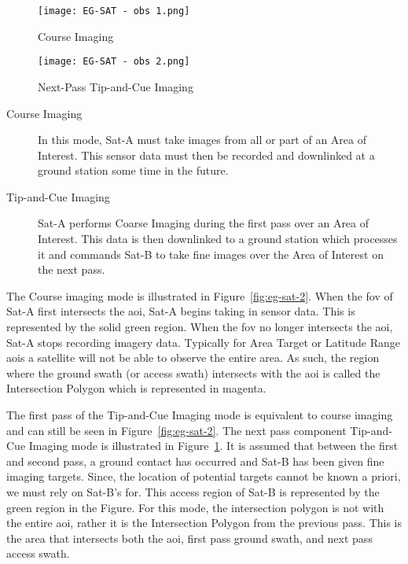 \begin{figure} 
    \centering
    \begin{minipage}[c]{0.49\textwidth}
	\centering
	\texttt{[image: EG-SAT - obs 1.png]} 
	\caption{Course Imaging}
	\label{fig:eg-sat-2} 
    \end{minipage}
    \hfill
    \begin{minipage}[c]{0.49\textwidth}
	\centering
	\texttt{[image: EG-SAT - obs 2.png]} 
	\caption{Next-Pass Tip-and-Cue Imaging}
	\label{fig:eg-sat-3} 
    \end{minipage} 
\end{figure}


\begin{description} 

    \item[Course Imaging] In this mode, Sat-A must take images from all or part
	of an Area of Interest. This sensor data must then be recorded and
	downlinked at a ground station some time in the future.

    \item[Tip-and-Cue Imaging] Sat-A performs Coarse Imaging during the first
	pass over an Area of Interest. This data is then downlinked to a ground
	station which processes it and commands Sat-B to take fine images over
	the Area of Interest on the next pass.

\end{description}

The Course imaging mode is illustrated in Figure~\ref{fig:eg-sat-2}. When the
\gls{fov} of Sat-A first intersects the \gls{aoi}, Sat-A begins taking in
sensor data. This is represented by the solid green region.  When the \gls{fov}
no longer intersects the \gls{aoi}, Sat-A stops recording imagery data.
Typically for Area Target or Latitude Range \glspl{aoi} a satellite will not be
able to observe the entire area. As such, the region where the ground swath (or
access swath) intersects with the \gls{aoi} is called the Intersection Polygon
which is represented in magenta. 

The first pass of the Tip-and-Cue Imaging mode is equivalent to course imaging
and can still be seen in Figure~\ref{fig:eg-sat-2}. The next pass component
Tip-and-Cue Imaging mode is illustrated in Figure~\ref{fig:eg-sat-3}. It is
assumed that between the first and second pass, a ground contact has occurred and
Sat-B has been given fine imaging targets. Since, the location of potential
targets cannot be known a priori, we must rely on Sat-B's \gls{for}.  This
access region of Sat-B is represented by the green region in the Figure. For
this mode, the intersection polygon is not with the entire \gls{aoi}, rather it
is the Intersection Polygon from the previous pass. This is the area that
intersects both the \gls{aoi}, first pass ground swath, and next pass access
swath.  


